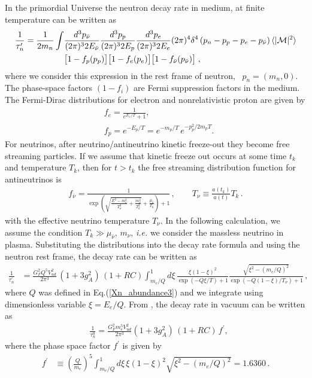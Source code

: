 In the primordial Universe the neutron decay rate in medium, at finite temperature can be written as~\cite{Kuznetsova:2010pi}
\begin{align}
\frac{1}{\tau^\prime_n}=\frac{1}{2m_n}\int&\frac{d^3p_{\bar{\nu}}}{(2\pi)^32E_{\bar{\nu}}}\frac{d^3p_p}{(2\pi)^32E_p}\frac{d^3p_e}{(2\pi)^32E_e}(2\pi)^4\delta^4\left(p_n-p_p-p_e-p_{\bar{\nu}}\right)\langle|\mathcal{M}|^2\rangle\notag\\
&\big[1-f_p(p_p)\big]\big[1-f_e(p_e)\big]\big[1-f_{\bar{\nu}}(p_{\bar{\nu}})\big]\;,
\end{align}
where we consider this expression in the rest frame of neutron, \ie\ $p_n=(m_n,0)$. The phase-space factors $(1-f_i)$ are Fermi suppression factors in the medium. The Fermi-Dirac distributions for electron and nonrelativistic proton are given by
\begin{align}
&f_e=\frac{1}{e^{E_e/T}+1},\\
&f_p=e^{-E_p/T}=e^{-m_p/T}\,e^{-p_p^2/2m_pT}.
\end{align}
For neutrinos, after neutrino/antineutrino kinetic freeze-out they become free streaming particles. If we assume that kinetic freeze out occurs at some time $t_k$ and temperature $T_k$, then for $t>t_k$ the free streaming distribution function  for antineutrinos is
\begin{align}
f_{\bar{\nu}}=\frac{1}{\exp{\left(\sqrt{\frac{E^2-m_\nu^2}{T_\nu^2}+\frac{m^2_\nu}{T^2_k}}+\frac{\mu_{\bar{\nu}}}{T_k}\right)+1}}\,,\qquad
T_\nu\equiv\frac{a(t_k)}{a(t)}T_k\,.
\end{align}
with the effective neutrino temperature $T_\nu$. In the following calculation, we assume the condition $T_k\gg\mu_{\bar{\nu}},\,m_\nu$, {\it i.e.\/} we consider the massless neutrino in plasma. Substituting the distributions into the decay rate formula and using the neutron rest frame, the decay rate can be written as 
\begin{align}
\label{Decay_rate_01}
\frac{1}{\tau_n^\prime}&=\frac{G^2_FQ^5V^2_{ud}}{2\pi^3}\,(1+3g^2_A)\,(1+RC)
\int^1_{m_e/Q}d\xi\,\frac{\xi(1-\xi)^2}{\exp\left(-Q\xi/{T}\right)+1}\frac{\sqrt{\xi^2-(m_e/Q)^2}}{\exp\left(-Q(1-\xi)/T_\nu\right)+1}\,,
\end{align} 
where $Q$ was defined in Eq.\;(\ref{Xn_abundance3}) and we integrate using dimensionless variable $\xi=E_e/Q$. From , the decay rate in vacuum can be written as
\begin{align}
&\frac{1}{\tau_n^0}=\frac{G^2_Fm_e^5V^2_{ud}}{2\pi^3}(1+3g^2_A)\,(1+RC)\,f^\prime,
\end{align}
where the phase space factor $f^\prime$ is given by
\begin{align}
f^\prime&\equiv\left(\frac{Q}{m_e}\right)^5\int^1_{m_e/Q}d\xi\,{\xi(1-\xi)^2}\sqrt{\xi^2-(m_e/Q)^2}=1.6360\,.
\end{align}

